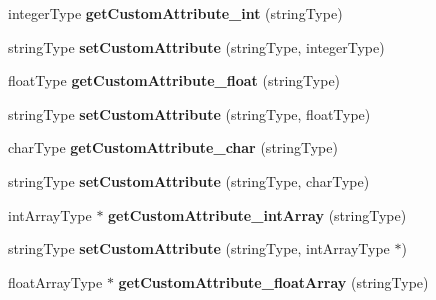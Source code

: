 \begin{DoxyCompactItemize}
\item 
\hypertarget{classAbstractComponent_a88a120e6732cde0b7246edda692bb89c}{integer\-Type {\bfseries get\-Custom\-Attribute\-\_\-int} (string\-Type)}\label{classAbstractComponent_a88a120e6732cde0b7246edda692bb89c}

\item 
\hypertarget{classAbstractComponent_ae4607d363f7414f492b53bf87ce61104}{string\-Type {\bfseries set\-Custom\-Attribute} (string\-Type, integer\-Type)}\label{classAbstractComponent_ae4607d363f7414f492b53bf87ce61104}

\item 
\hypertarget{classAbstractComponent_aa76e01688659472e3ca4ec89a22a0789}{float\-Type {\bfseries get\-Custom\-Attribute\-\_\-float} (string\-Type)}\label{classAbstractComponent_aa76e01688659472e3ca4ec89a22a0789}

\item 
\hypertarget{classAbstractComponent_ae391afdd25aa68be50a14c6d4c6c79e0}{string\-Type {\bfseries set\-Custom\-Attribute} (string\-Type, float\-Type)}\label{classAbstractComponent_ae391afdd25aa68be50a14c6d4c6c79e0}

\item 
\hypertarget{classAbstractComponent_a3c18b0117f78cf42e2d0cc6142def73f}{char\-Type {\bfseries get\-Custom\-Attribute\-\_\-char} (string\-Type)}\label{classAbstractComponent_a3c18b0117f78cf42e2d0cc6142def73f}

\item 
\hypertarget{classAbstractComponent_ac2413f41498766b1ea666ed9252451a4}{string\-Type {\bfseries set\-Custom\-Attribute} (string\-Type, char\-Type)}\label{classAbstractComponent_ac2413f41498766b1ea666ed9252451a4}

\item 
\hypertarget{classAbstractComponent_aa09adff3a61615f80f5c1a0cddd724c4}{int\-Array\-Type $\ast$ {\bfseries get\-Custom\-Attribute\-\_\-int\-Array} (string\-Type)}\label{classAbstractComponent_aa09adff3a61615f80f5c1a0cddd724c4}

\item 
\hypertarget{classAbstractComponent_a2a9dda6720caa71588cd000fbbad9ea4}{string\-Type {\bfseries set\-Custom\-Attribute} (string\-Type, int\-Array\-Type $\ast$)}\label{classAbstractComponent_a2a9dda6720caa71588cd000fbbad9ea4}

\item 
\hypertarget{classAbstractComponent_a15c2b0edc65af347c470d6302523c937}{float\-Array\-Type $\ast$ {\bfseries get\-Custom\-Attribute\-\_\-float\-Array} (string\-Type)}\label{classAbstractComponent_a15c2b0edc65af347c470d6302523c937}


\end{DoxyCompactItemize}
